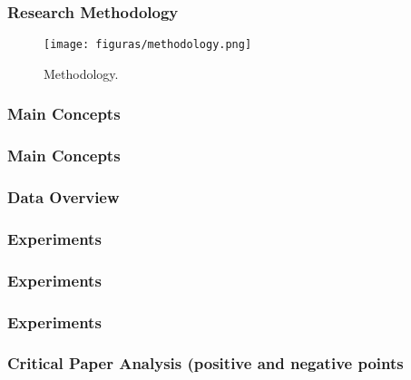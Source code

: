 \documentclass{beamer}
\begin{document}
\begin{frame}
\frametitle{Research Methodology}
 \begin{figure}[!htb]
\centering  
\texttt{[image: figuras/methodology.png]}
\caption{Methodology.}
\end{figure}
\end{frame}

\begin{frame}
\frametitle{Main Concepts}

\end{frame}



\begin{frame}
\frametitle{Main Concepts}

\end{frame}

\begin{frame}
\frametitle{Data Overview}


\end{frame}

\begin{frame}
\frametitle{Experiments}


\end{frame}



\begin{frame}
\frametitle{Experiments}

\end{frame}

\begin{frame}
\frametitle{Experiments}

\end{frame}


\begin{frame}
\frametitle{Critical Paper Analysis (positive and negative points}

\end{frame}
\end{document}
